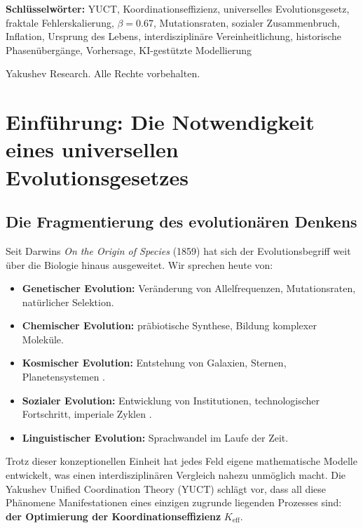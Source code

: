 \documentclass[12pt,a4paper]{article}
\theoremstyle{remark}
\newcommand{\Keff}{K_{\mathrm{eff}}}
\begin{document}
\begin{titlepage}
\begin{center}
			\vspace{1cm}
			
			\noindent
			\small\textbf{Schlüsselwörter:} YUCT, Koordinationseffizienz, universelles Evolutionsgesetz, fraktale Fehlerskalierung, $\beta=0.67$, Mutationsraten, sozialer Zusammenbruch, Inflation, Ursprung des Lebens, interdisziplinäre Vereinheitlichung, historische Phasenübergänge, Vorhersage, KI-gestützte Modellierung
			
			\vspace{0.5cm}
			
			\noindent
			 Yakushev Research. Alle Rechte vorbehalten.
		\end{center}
	\end{titlepage}
	
	\tableofcontents
	\newpage
	
	\section{Einführung: Die Notwendigkeit eines universellen Evolutionsgesetzes}
	
	\subsection{Die Fragmentierung des evolutionären Denkens}
	
	Seit Darwins \textit{On the Origin of Species} (1859) \cite{Darwin1859} hat sich der Evolutionsbegriff weit über die Biologie hinaus ausgeweitet. Wir sprechen heute von:
	
	\begin{itemize}
		\item \textbf{Genetischer Evolution:} Veränderung von Allelfrequenzen, Mutationsraten, natürlicher Selektion.
		\item \textbf{Chemischer Evolution:} präbiotische Synthese, Bildung komplexer Moleküle.
		\item \textbf{Kosmischer Evolution:} Entstehung von Galaxien, Sternen, Planetensystemen \cite{Chaisson2001}.
		\item \textbf{Sozialer Evolution:} Entwicklung von Institutionen, technologischer Fortschritt, imperiale Zyklen \cite{Boulding1978}.
		\item \textbf{Linguistischer Evolution:} Sprachwandel im Laufe der Zeit.
	\end{itemize}
	
	Trotz dieser konzeptionellen Einheit hat jedes Feld eigene mathematische Modelle entwickelt, was einen interdisziplinären Vergleich nahezu unmöglich macht. Die Yakushev Unified Coordination Theory (YUCT) schlägt vor, dass all diese Phänomene Manifestationen eines einzigen zugrunde liegenden Prozesses sind: \textbf{der Optimierung der Koordinationseffizienz} $\Keff$.
	
\end{document}

